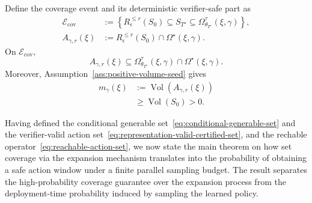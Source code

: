 \begin{itemize}[leftmargin=0pt, itemindent=0pt, label={}]
Define the coverage event and its deterministic verifier-safe part as
\begin{align}
\mathcal E_{\mathrm{cov}}
&:=
\left\{
R_\epsilon^{\le r}(S_0)
\subseteq S_{T^\star}
\subseteq\Omega_{\theta_{T^\star}}^\tau(\xi,\gamma)
\right\},
\label{eq:coverage-event}\\
A_{\gamma,r}(\xi)
&:=
R_\epsilon^{\le r}(S_0)
\cap\Omega^\star(\xi,\gamma).
\label{eq:safe-reachable-region}
\end{align}
On \(\mathcal E_{\mathrm{cov}}\),
\begin{equation}
A_{\gamma,r}(\xi)
\subseteq
\Omega_{\theta_{T^\star}}^\tau(\xi,\gamma)
\cap\Omega^\star(\xi,\gamma).
\label{eq:safe-generable-inclusion}
\end{equation}
Moreover, Assumption~\ref{ass:positive-volume-seed} gives
\begin{equation}
\begin{aligned}
m_\gamma(\xi)
&:=
\operatorname{Vol}\!\left(A_{\gamma,r}(\xi)\right)\\
&\ge\operatorname{Vol}(S_0)>0.
\end{aligned}
\label{eq:positive-reachable-volume}
\end{equation}

Having defined the conditional generable set~\eqref{eq:conditional-generable-set} and the verifier-valid action set~\eqref{eq:representation-valid-certified-set}, and the rechable operator~\eqref{eq:reachable-action-set}, we now state the main theorem on how set coverage via the expansion mechanism translates into the probability of obtaining a safe action window under a finite parallel sampling budget. The result separates the high-probability coverage guarantee over the expansion process from the deployment-time probability induced by sampling the learned policy.


\end{itemize}
